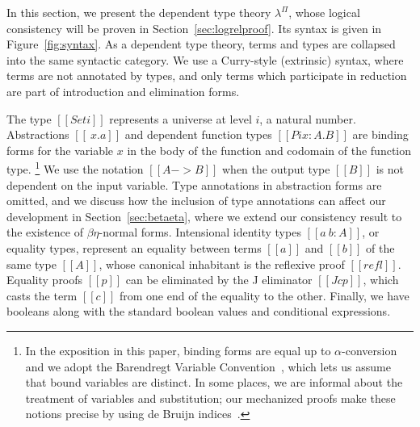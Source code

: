 \documentclass[\ifpublic nolinenum\else\fi,online,OA]{jfp}
\newcommand{\lang}{$\lambda^{\Pi}$\xspace}
\theoremstyle{definition}
\begin{document}
In this section, we present the dependent type theory \lang{}, whose logical
consistency will be proven in Section~\ref{sec:logrelproof}.
Its syntax is given in Figure~\ref{fig:syntax}. As a dependent
type theory, terms and types are collapsed into the same syntactic
category. We use a Curry-style (extrinsic) syntax, where terms are not
annotated by types, and only terms which participate in reduction are part of
introduction and elimination forms.

The type $[[Set i]]$ represents a universe at level $i$,
a natural number. Abstractions $[[ \ x . a ]]$ and
dependent function types $[[Pi x : A . B]]$ are binding forms for the variable
$x$ in the body of the function and codomain of the function type.%
\footnote{In the exposition in this paper, binding forms are equal up to
  $\alpha$-conversion and we adopt the Barendregt Variable
  Convention~\cite{barendregt:lambda-calculus}, which lets us assume that
  bound variables are distinct.  In some places, we are informal about the
  treatment of variables and substitution; our mechanized proofs make these
  notions precise by using de Bruijn indices~\citep{debruijn1994automath}. }
We use the notation $[[A -> B]]$ when the output type $[[B]]$ is not dependent
on the input variable. Type annotations in abstraction forms are omitted, and
we discuss how the inclusion of type annotations can affect
our development in Section~\ref{sec:betaeta}, where we extend our
consistency result to the existence of $\beta\eta$-normal forms.
Intensional identity types $[[a ~ b : A]]$, or equality types, represent an
equality between terms $[[a]]$ and $[[b]]$ of the same type $[[A]]$, whose
canonical inhabitant is the reflexive proof $[[refl]]$. Equality proofs $[[p]]$
can be eliminated by the J eliminator $[[J c p]]$, which casts the term $[[c]]$
from one end of the equality to the other. Finally, we have booleans along with
the standard boolean values and conditional expressions.
\end{document}
